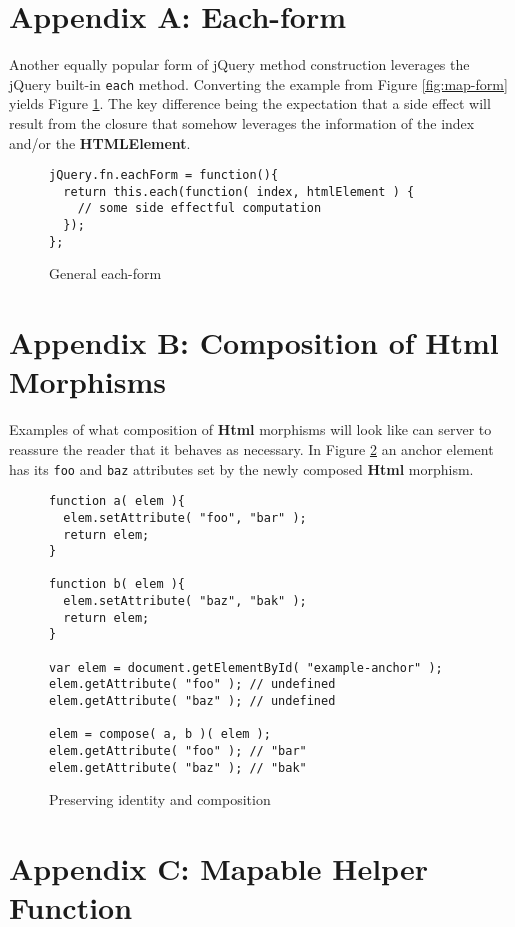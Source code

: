\documentclass[preprint]{sigplanconf}
\begin{document}
\appendix
\section{Appendix A: Each-form}

Another equally popular form of jQuery method construction leverages the jQuery built-in \verb|each| method. Converting the example from Figure \ref{fig:map-form} yields Figure \ref{fig:each-form}. The key difference being the expectation that a side effect will result from the closure that somehow leverages the information of the index and/or the \textbf{HTMLElement}.

\begin{figure}[!ht]
\small
\begin{verbatim}
jQuery.fn.eachForm = function(){
  return this.each(function( index, htmlElement ) {
    // some side effectful computation
  });
};
\end{verbatim}
\nocaptionrule \caption{General each-form}
\label{fig:each-form}
\end{figure}

\section{Appendix B: Composition of Html Morphisms}

Examples of what composition of \textbf{Html} morphisms will look like can server to reassure the reader that it behaves as necessary. In Figure \ref{fig:html-compose} an anchor element has its \verb|foo| and \verb|baz| attributes set by the newly composed \textbf{Html} morphism.

\begin{figure}[!ht]
\small
\begin{verbatim}
function a( elem ){
  elem.setAttribute( "foo", "bar" );
  return elem;
}

function b( elem ){
  elem.setAttribute( "baz", "bak" );
  return elem;
}

var elem = document.getElementById( "example-anchor" );
elem.getAttribute( "foo" ); // undefined
elem.getAttribute( "baz" ); // undefined

elem = compose( a, b )( elem );
elem.getAttribute( "foo" ); // "bar"
elem.getAttribute( "baz" ); // "bak"
\end{verbatim}
\nocaptionrule \caption{Preserving identity and composition}
\label{fig:html-compose}
\end{figure}

\section{Appendix C: Mapable Helper Function}
\end{document}
